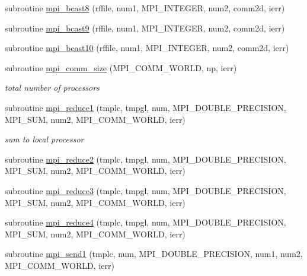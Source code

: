 \begin{DoxyCompactItemize}
\item 
subroutine \mbox{\hyperlink{namespacempistub_a8a78645877ad94bcd0dbb6240b20f15a}{mpi\+\_\+bcast8}} (rffile, num1, M\+P\+I\+\_\+\+I\+N\+T\+E\+G\+ER, num2, comm2d, ierr)
\item 
subroutine \mbox{\hyperlink{namespacempistub_ab1b85417ae697305c4b8ede7fa7d5f26}{mpi\+\_\+bcast9}} (rffile, num1, M\+P\+I\+\_\+\+I\+N\+T\+E\+G\+ER, num2, comm2d, ierr)
\item 
subroutine \mbox{\hyperlink{namespacempistub_a75581dd8d19054f24cda24cb93a956a3}{mpi\+\_\+bcast10}} (rffile, num1, M\+P\+I\+\_\+\+I\+N\+T\+E\+G\+ER, num2, comm2d, ierr)
\item 
subroutine \mbox{\hyperlink{namespacempistub_a188b67a76569dcb918a27f48018e6baf}{mpi\+\_\+comm\+\_\+size}} (M\+P\+I\+\_\+\+C\+O\+M\+M\+\_\+\+W\+O\+R\+LD, np, ierr)
\begin{DoxyCompactList}\small\item\em total number of processors \end{DoxyCompactList}\item 
subroutine \mbox{\hyperlink{namespacempistub_a6ba478c1e620c237eb85776943b327ad}{mpi\+\_\+reduce1}} (tmplc, tmpgl, num, M\+P\+I\+\_\+\+D\+O\+U\+B\+L\+E\+\_\+\+P\+R\+E\+C\+I\+S\+I\+ON, M\+P\+I\+\_\+\+S\+UM, num2, M\+P\+I\+\_\+\+C\+O\+M\+M\+\_\+\+W\+O\+R\+LD, ierr)
\begin{DoxyCompactList}\small\item\em sum to local processor \end{DoxyCompactList}\item 
subroutine \mbox{\hyperlink{namespacempistub_a1b64afd5481e729d54724f7427b4a32f}{mpi\+\_\+reduce2}} (tmplc, tmpgl, num, M\+P\+I\+\_\+\+D\+O\+U\+B\+L\+E\+\_\+\+P\+R\+E\+C\+I\+S\+I\+ON, M\+P\+I\+\_\+\+S\+UM, num2, M\+P\+I\+\_\+\+C\+O\+M\+M\+\_\+\+W\+O\+R\+LD, ierr)
\item 
subroutine \mbox{\hyperlink{namespacempistub_a781c5f26f7ee9bdffdc195be7eaa07ef}{mpi\+\_\+reduce3}} (tmplc, tmpgl, num, M\+P\+I\+\_\+\+D\+O\+U\+B\+L\+E\+\_\+\+P\+R\+E\+C\+I\+S\+I\+ON, M\+P\+I\+\_\+\+S\+UM, num2, M\+P\+I\+\_\+\+C\+O\+M\+M\+\_\+\+W\+O\+R\+LD, ierr)
\item 
subroutine \mbox{\hyperlink{namespacempistub_ad1156be68f1c3c3dd3d844d6d4cee160}{mpi\+\_\+reduce4}} (tmplc, tmpgl, num, M\+P\+I\+\_\+\+D\+O\+U\+B\+L\+E\+\_\+\+P\+R\+E\+C\+I\+S\+I\+ON, M\+P\+I\+\_\+\+S\+UM, num2, M\+P\+I\+\_\+\+C\+O\+M\+M\+\_\+\+W\+O\+R\+LD, ierr)
\item 
subroutine \mbox{\hyperlink{namespacempistub_aa276a91b8fd09a5bf247b20692731dd8}{mpi\+\_\+send1}} (tmplc, num, M\+P\+I\+\_\+\+D\+O\+U\+B\+L\+E\+\_\+\+P\+R\+E\+C\+I\+S\+I\+ON, num1, num2, M\+P\+I\+\_\+\+C\+O\+M\+M\+\_\+\+W\+O\+R\+LD, ierr)

\end{DoxyCompactItemize}

